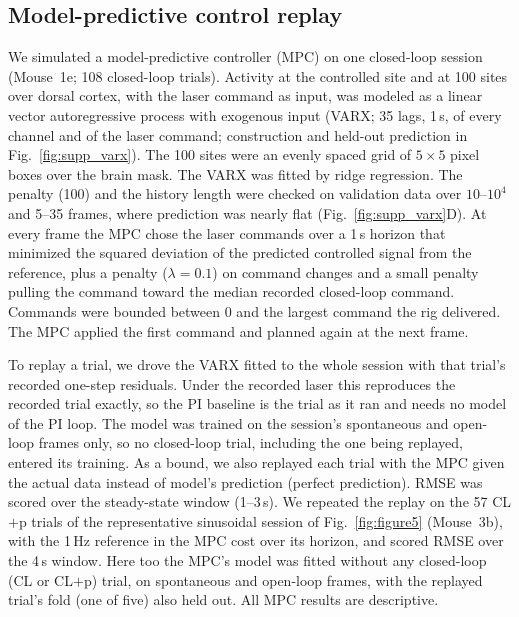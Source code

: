 \subsection*{Model-predictive control replay}
\label{sec:mpc}

We simulated a model-predictive controller (MPC) on one closed-loop session (Mouse~1e; 108 closed-loop trials).
Activity at the controlled site and at 100 sites over dorsal cortex, with the laser command as input, was modeled as a linear vector autoregressive process with exogenous input (VARX; 35 lags, 1\,s, of every channel and of the laser command; construction and held-out prediction in Fig.~\ref{fig:supp_varx}).
The 100 sites were an evenly spaced grid of $5 \times 5$ pixel boxes over the brain mask.
The VARX was fitted by ridge regression.
The penalty (100) and the history length were checked on validation data over $10$--$10^{4}$ and 5--35 frames, where prediction was nearly flat (Fig.~\ref{fig:supp_varx}D).
At every frame the MPC chose the laser commands over a 1\,s horizon that minimized the squared deviation of the predicted controlled signal from the reference, plus a penalty ($\lambda = 0.1$) on command changes and a small penalty pulling the command toward the median recorded closed-loop command.
Commands were bounded between 0 and the largest command the rig delivered.
The MPC applied the first command and planned again at the next frame.

To replay a trial, we drove the VARX fitted to the whole session with that trial's recorded one-step residuals.
Under the recorded laser this reproduces the recorded trial exactly, so the PI baseline is the trial as it ran and needs no model of the PI loop.
The model was trained on the session's spontaneous and open-loop frames only, so no closed-loop trial, including the one being replayed, entered its training.
As a bound, we also replayed each trial with the MPC given the actual data instead of model's prediction (perfect prediction).
RMSE was scored over the steady-state window (1--3\,s).
We repeated the replay on the 57 CL$+$p trials of the representative sinusoidal session of Fig.~\ref{fig:figure5} (Mouse~3b), with the 1\,Hz reference in the MPC cost over its horizon, and scored RMSE over the 4\,s window.
Here too the MPC's model was fitted without any closed-loop (CL or CL$+$p) trial, on spontaneous and open-loop frames, with the replayed trial's fold (one of five) also held out.
All MPC results are descriptive.

